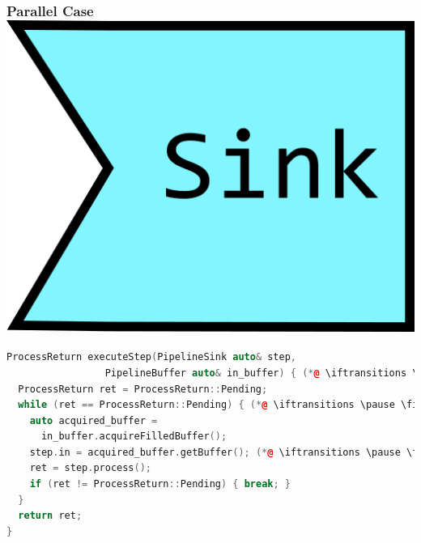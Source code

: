 \documentclass[aspectratio=169]{beamer}
\newif\iftransitions
\begin{document}

\begin{frame}[fragile]
  \frametitle{Parallel Case \hspace{320pt} \includegraphics[height=.1\textheight]{pipelinesgfx/sink.png}}

  \begin{lstlisting}[language={C++}]
ProcessReturn executeStep(PipelineSink auto& step,
                 PipelineBuffer auto& in_buffer) { (*@ \iftransitions \pause \fi @*)
  ProcessReturn ret = ProcessReturn::Pending;
  while (ret == ProcessReturn::Pending) { (*@ \iftransitions \pause \fi @*)
    auto acquired_buffer =
      in_buffer.acquireFilledBuffer();
    step.in = acquired_buffer.getBuffer(); (*@ \iftransitions \pause \fi @*)
    ret = step.process();
    if (ret != ProcessReturn::Pending) { break; }
  }
  return ret;
}
  \end{lstlisting}
\end{frame}
\end{document}
